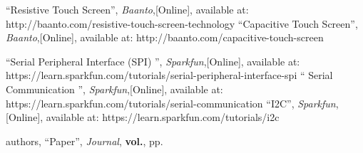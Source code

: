 \begin{thebibliography}{5}
 ``Resistive Touch Screen'', \emph{Baanto},[Online], available at: http://baanto.com/resistive-touch-screen-technology
 ``Capacitive Touch Screen'', \emph{Baanto},[Online], available at: http://baanto.com/capacitive-touch-screen

 ``Serial Peripheral Interface (SPI) '', \emph{Sparkfun},[Online], available at: https://learn.sparkfun.com/tutorials/serial-peripheral-interface-spi
 `` Serial Communication '', \emph{Sparkfun},[Online], available at: https://learn.sparkfun.com/tutorials/serial-communication 
 ``I2C'', \emph{Sparkfun},[Online], available at: https://learn.sparkfun.com/tutorials/i2c


 authors, ``Paper'', \emph{Journal}, \textbf{vol.}, pp. 
\end{thebibliography}

